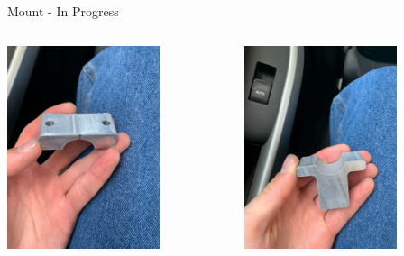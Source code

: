 \begin{frame}{Mount - In Progress}
    \begin{columns}
        \begin{column}{0.5\textwidth}
            \includegraphics[height=0.7\textheight,width=0.7\textwidth,keepaspectratio]{images/fs_mount1.jpg}
        \end{column}
        \begin{column}{0.5\textwidth}
            \includegraphics[height=0.7\textheight,width=0.7\textwidth,keepaspectratio]{images/fs_mount2.jpg}
        \end{column}
    \end{columns}
\end{frame}

